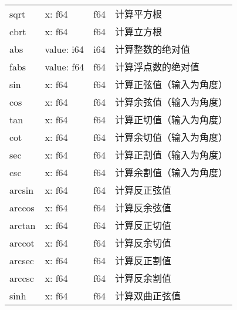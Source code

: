 \begin{longtable}[c]{@{}llll@{}}
    sqrt               & x: f64                                                 & f64         & 计算平方根          \\
    cbrt               & x: f64                                                 & f64         & 计算立方根          \\
    abs                & value: i64                                             & i64         & 计算整数的绝对值       \\
    fabs               & value: f64                                             & f64         & 计算浮点数的绝对值      \\
    sin                & x: f64                                                 & f64         & 计算正弦值（输入为角度）   \\
    cos                & x: f64                                                 & f64         & 计算余弦值（输入为角度）   \\
    tan                & x: f64                                                 & f64         & 计算正切值（输入为角度）   \\
    cot                & x: f64                                                 & f64         & 计算余切值（输入为角度）   \\
    sec                & x: f64                                                 & f64         & 计算正割值（输入为角度）   \\
    csc                & x: f64                                                 & f64         & 计算余割值（输入为角度）   \\
    arcsin             & x: f64                                                 & f64         & 计算反正弦值         \\
    arccos             & x: f64                                                 & f64         & 计算反余弦值         \\
    arctan             & x: f64                                                 & f64         & 计算反正切值         \\
    arccot             & x: f64                                                 & f64         & 计算反余切值         \\
    arcsec             & x: f64                                                 & f64         & 计算反正割值         \\
    arccsc             & x: f64                                                 & f64         & 计算反余割值         \\
    sinh               & x: f64                                                 & f64         & 计算双曲正弦值        \\

\end{longtable}

